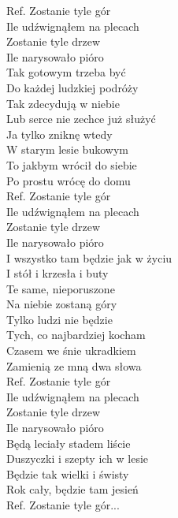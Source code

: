 
\begin{flushleft}
Ref. Zostanie tyle gór \tab{} \\
\hspace{0.9cm}Ile udźwignąłem na plecach \\
\hspace{0.9cm}Zostanie tyle drzew \tab{}\\
\hspace{0.9cm}Ile narysowało pióro \tab{} \\
\vskip 3mm
Tak gotowym trzeba być  \\
Do każdej ludzkiej podróży \\
Tak zdecydują w niebie \\
Lub serce nie zechce już służyć \\
Ja tylko zniknę wtedy \\
W starym lesie bukowym \\
To jakbym wrócił do siebie \\
Po prostu wrócę do domu \\
\vskip 3mm
Ref. Zostanie tyle gór  \\
\hspace{0.9cm}Ile udźwignąłem na plecach \\
\hspace{0.9cm}Zostanie tyle drzew \\
\hspace{0.9cm}Ile narysowało pióro  \\
\vskip 3mm
I wszystko tam będzie jak w życiu \\
I stół i krzesła i buty \\
Te same, nieporuszone \\
Na niebie zostaną góry \\
Tylko ludzi nie będzie \\
Tych, co najbardziej kocham \\
Czasem we śnie ukradkiem \\
Zamienią ze mną dwa słowa \\
\vskip 3mm
Ref. Zostanie tyle gór  \\
\hspace{0.9cm}Ile udźwignąłem na plecach \\
\hspace{0.9cm}Zostanie tyle drzew \\
\hspace{0.9cm}Ile narysowało pióro  \\
\vskip 3mm
Będą leciały stadem liście \\
Duszyczki i szepty ich w lesie \\
Będzie tak wielki i świsty \\
Rok cały, będzie tam jesień \\
\vskip 3mm
Ref. Zostanie tyle gór...
\end{flushleft}
\clearpage
